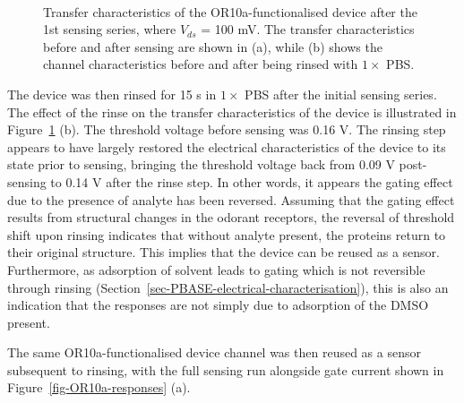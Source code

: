 \documentclass[
  a4paper,
]{scrbook}
\begin{document}
\begin{figure}
\begin{minipage}[t]{0.46\linewidth}
{{}

}

\end{minipage}%
%
\begin{minipage}[t]{0.01\linewidth}

{\centering 

~

}

\end{minipage}%

\caption[Transfer characteristics of the OR10a-functionalised device
after the 1st sensing series.]{\label{fig-OR10a-TX-1}Transfer
characteristics of the OR10a-functionalised device after the 1st sensing
series, where \(V_{ds}\) = 100 mV. The transfer characteristics before
and after sensing are shown in (a), while (b) shows the channel
characteristics before and after being rinsed with \(1 \times\) PBS.}

\end{figure}

The device was then rinsed for 15 s in \(1 \times\) PBS after the
initial sensing series. The effect of the rinse on the transfer
characteristics of the device is illustrated in
Figure~\ref{fig-OR10a-TX-1} (b). The threshold voltage before sensing
was 0.16 V. The rinsing step appears to have largely restored the
electrical characteristics of the device to its state prior to sensing,
bringing the threshold voltage back from 0.09 V post-sensing to 0.14 V
after the rinse step. In other words, it appears the gating effect due
to the presence of analyte has been reversed. Assuming that the gating
effect results from structural changes in the odorant receptors, the
reversal of threshold shift upon rinsing indicates that without analyte
present, the proteins return to their original structure. This implies
that the device can be reused as a sensor. Furthermore, as adsorption of
solvent leads to gating which is not reversible through rinsing
(Section~\ref{sec-PBASE-electrical-characterisation}), this is also an
indication that the responses are not simply due to adsorption of the
DMSO present.

The same OR10a-functionalised device channel was then reused as a sensor
subsequent to rinsing, with the full sensing run alongside gate current
shown in Figure~\ref{fig-OR10a-responses} (a).
\end{document}
